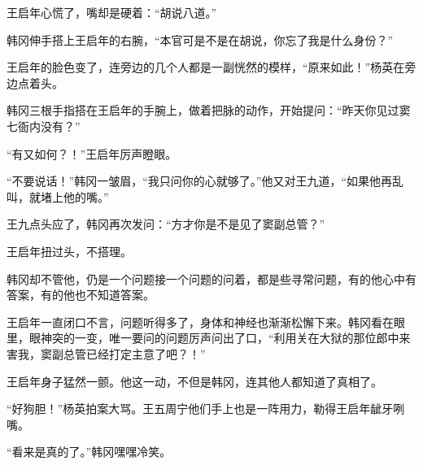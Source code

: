 王启年心慌了，嘴却是硬着：“胡说八道。”

韩冈伸手搭上王启年的右腕，“本官可是不是在胡说，你忘了我是什么身份？”

王启年的脸色变了，连旁边的几个人都是一副恍然的模样，“原来如此！”杨英在旁边点着头。

韩冈三根手指搭在王启年的手腕上，做着把脉的动作，开始提问：“昨天你见过窦七衙内没有？”

“有又如何？！”王启年厉声瞪眼。

“不要说话！”韩冈一皱眉，“我只问你的心就够了。”他又对王九道，“如果他再乱叫，就堵上他的嘴。”

王九点头应了，韩冈再次发问：“方才你是不是见了窦副总管？”

王启年扭过头，不搭理。

韩冈却不管他，仍是一个问题接一个问题的问着，都是些寻常问题，有的他心中有答案，有的他也不知道答案。

王启年一直闭口不言，问题听得多了，身体和神经也渐渐松懈下来。韩冈看在眼里，眼神突的一变，唯一要问的问题厉声问出了口，“利用关在大狱的那位郎中来害我，窦副总管已经打定主意了吧？！”

王启年身子猛然一颤。他这一动，不但是韩冈，连其他人都知道了真相了。

“好狗胆！”杨英拍案大骂。王五周宁他们手上也是一阵用力，勒得王启年龇牙咧嘴。

“看来是真的了。”韩冈嘿嘿冷笑。

